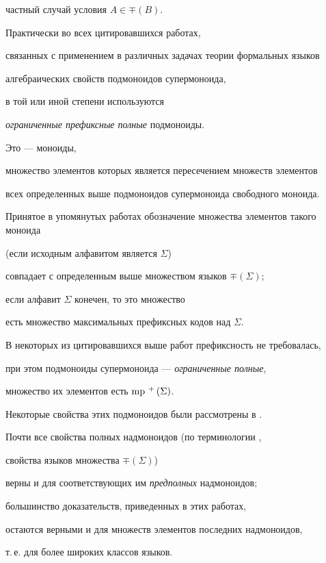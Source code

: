  частный случай условия $A\in\mp(B)$.





 Практически во всех цитировавшихся работах,


 связанных с применением в различных задачах теории формальных языков


 алгебраических свойств подмоноидов супермоноида,


 в той или иной степени используются


 {\it ограниченные префиксные полные\/} подмоноиды.


 Это --- моноиды,


 множество элементов которых является пересечением множеств элементов


 всех определенных выше подмоноидов супермоноида свободного моноида.


 Принятое в упомянутых работах обозначение множества элементов такого моноида


 (если исходным алфавитом является $\Sigma$)


 совпадает с определенным выше множеством языков $\mp(\Sigma)$;


 если алфавит $\Sigma$ конечен, то это множество


 есть множество максимальных префиксных кодов над $\Sigma$.





 В некоторых из цитировавшихся выше работ префиксность не требовалась,


 при этом подмоноиды супермоноида --- {\it ограниченные полные\/},


 множество их элементов есть $\operatorname{mp}\,^+\,(\Sigma)$.


 Некоторые свойства этих подмоноидов были рассмотрены в \cite{io7}.





 Почти все свойства полных надмоноидов (по терминологии \cite{medu},


\cite{io7} свойства языков множества $\mp(\Sigma)$)


 верны и для соответствующих им {\it предполных\/} надмоноидов;


 большинство доказательств, приведенных в этих работах,


 остаются верными и для множеств элементов последних надмоноидов,


 т.\,е. для более широких классов языков.


